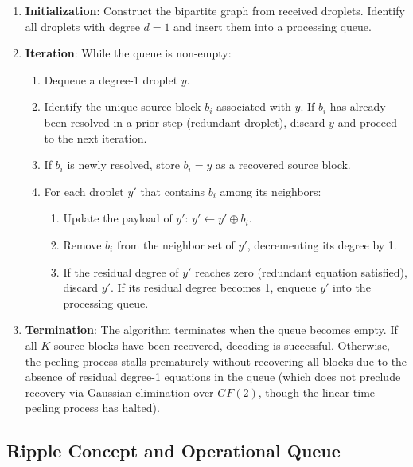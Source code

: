 \begin{enumerate}
    \item \textbf{Initialization}: Construct the bipartite graph from received droplets. Identify all droplets with degree $d = 1$ and insert them into a processing queue.
    
    \item \textbf{Iteration}: While the queue is non-empty:
    \begin{enumerate}
        \item Dequeue a degree-1 droplet $y$.
        \item Identify the unique source block $b_i$ associated with $y$. If $b_i$ has already been resolved in a prior step (redundant droplet), discard $y$ and proceed to the next iteration.
        \item If $b_i$ is newly resolved, store $b_i = y$ as a recovered source block.
        \item For each droplet $y'$ that contains $b_i$ among its neighbors:
        \begin{enumerate}
            \item Update the payload of $y'$: $y' \leftarrow y' \oplus b_i$.
            \item Remove $b_i$ from the neighbor set of $y'$, decrementing its degree by 1.
            \item If the residual degree of $y'$ reaches zero (redundant equation satisfied), discard $y'$. If its residual degree becomes 1, enqueue $y'$ into the processing queue.
        \end{enumerate}
    \end{enumerate}
    
    \item \textbf{Termination}: The algorithm terminates when the queue becomes empty. If all $K$ source blocks have been recovered, decoding is successful. Otherwise, the peeling process stalls prematurely without recovering all blocks due to the absence of residual degree-1 equations in the queue (which does not preclude recovery via Gaussian elimination over $GF(2)$, though the linear-time peeling process has halted).
\end{enumerate}

\subsection{Ripple Concept and Operational Queue}
\label{sec:ripple_concept}


